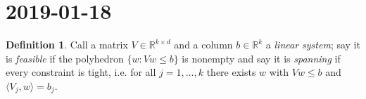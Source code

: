 \documentclass[12pt]{article}
\theoremstyle{definition}
\newtheorem{definition}{Definition}
\newcommand{\reals}{\mathbb{R}}
\begin{document}
%
%
%

\section{2019-01-18}

\begin{definition}
  Call a matrix $V \in \reals^{k \times d}$ and a column $b \in \reals^k$ a \emph{linear system}; say it is \emph{feasible} if the polyhedron $\{w : Vw \leq b\}$ is nonempty and say it is \emph{spanning} if every constraint is tight, i.e. for all $j=1,\dots,k$ there exists $w$ with $Vw \leq b$ and $\langle V_j, w \rangle = b_j$.
\end{definition}
\end{document}
